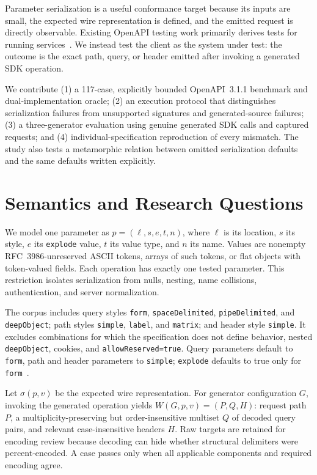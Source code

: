 \documentclass[runningheads]{llncs}
\begin{document}
Parameter serialization is a useful conformance target because its inputs are small, the expected wire representation is defined, and the emitted request is directly observable. Existing OpenAPI testing work primarily derives tests for running services~\cite{quickrest,restest,resttestgen,corradini}. We instead test the client as the system under test: the outcome is the exact path, query, or header emitted after invoking a generated SDK operation.

We contribute (1) a 117-case, explicitly bounded OpenAPI~3.1.1 benchmark and dual-implementation oracle; (2) an execution protocol that distinguishes serialization failures from unsupported signatures and generated-source failures; (3) a three-generator evaluation using genuine generated SDK calls and captured requests; and (4) individual-specification reproduction of every mismatch. The study also tests a metamorphic relation between omitted serialization defaults and the same defaults written explicitly.

\section{Semantics and Research Questions}

We model one parameter as $p=(\ell,s,e,t,n)$, where $\ell$ is its location, $s$ its style, $e$ its \texttt{explode} value, $t$ its value type, and $n$ its name. Values are nonempty RFC~3986-unreserved ASCII tokens, arrays of such tokens, or flat objects with token-valued fields. Each operation has exactly one tested parameter. This restriction isolates serialization from nulls, nesting, name collisions, authentication, and server normalization.

The corpus includes query styles \texttt{form}, \texttt{spaceDelimited}, \texttt{pipeDelimited}, and \texttt{deepObject}; path styles \texttt{simple}, \texttt{label}, and \texttt{matrix}; and header style \texttt{simple}. It excludes combinations for which the specification does not define behavior, nested \texttt{deepObject}, cookies, and \texttt{allowReserved=true}. Query parameters default to \texttt{form}, path and header parameters to \texttt{simple}; \texttt{explode} defaults to true only for \texttt{form}~\cite{oas}.

Let $\sigma(p,v)$ be the expected wire representation. For generator configuration $G$, invoking the generated operation yields $W(G,p,v)=(P,Q,H)$: request path $P$, a multiplicity-preserving but order-insensitive multiset $Q$ of decoded query pairs, and relevant case-insensitive headers $H$. Raw targets are retained for encoding review because decoding can hide whether structural delimiters were percent-encoded. A case passes only when all applicable components and required encoding agree.
\end{document}
